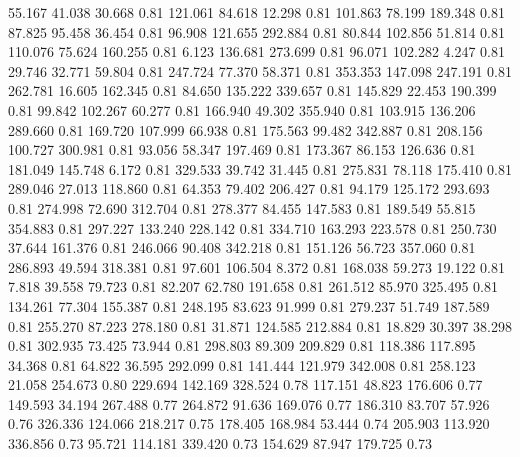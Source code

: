   55.167   41.038   30.668         0.81
 121.061   84.618   12.298         0.81
 101.863   78.199  189.348         0.81
  87.825   95.458   36.454         0.81
  96.908  121.655  292.884         0.81
  80.844  102.856   51.814         0.81
 110.076   75.624  160.255         0.81
   6.123  136.681  273.699         0.81
  96.071  102.282    4.247         0.81
  29.746   32.771   59.804         0.81
 247.724   77.370   58.371         0.81
 353.353  147.098  247.191         0.81
 262.781   16.605  162.345         0.81
  84.650  135.222  339.657         0.81
 145.829   22.453  190.399         0.81
  99.842  102.267   60.277         0.81
 166.940   49.302  355.940         0.81
 103.915  136.206  289.660         0.81
 169.720  107.999   66.938         0.81
 175.563   99.482  342.887         0.81
 208.156  100.727  300.981         0.81
  93.056   58.347  197.469         0.81
 173.367   86.153  126.636         0.81
 181.049  145.748    6.172         0.81
 329.533   39.742   31.445         0.81
 275.831   78.118  175.410         0.81
 289.046   27.013  118.860         0.81
  64.353   79.402  206.427         0.81
  94.179  125.172  293.693         0.81
 274.998   72.690  312.704         0.81
 278.377   84.455  147.583         0.81
 189.549   55.815  354.883         0.81
 297.227  133.240  228.142         0.81
 334.710  163.293  223.578         0.81
 250.730   37.644  161.376         0.81
 246.066   90.408  342.218         0.81
 151.126   56.723  357.060         0.81
 286.893   49.594  318.381         0.81
  97.601  106.504    8.372         0.81
 168.038   59.273   19.122         0.81
   7.818   39.558   79.723         0.81
  82.207   62.780  191.658         0.81
 261.512   85.970  325.495         0.81
 134.261   77.304  155.387         0.81
 248.195   83.623   91.999         0.81
 279.237   51.749  187.589         0.81
 255.270   87.223  278.180         0.81
  31.871  124.585  212.884         0.81
  18.829   30.397   38.298         0.81
 302.935   73.425   73.944         0.81
 298.803   89.309  209.829         0.81
 118.386  117.895   34.368         0.81
  64.822   36.595  292.099         0.81
 141.444  121.979  342.008         0.81
 258.123   21.058  254.673         0.80
 229.694  142.169  328.524         0.78
 117.151   48.823  176.606         0.77
 149.593   34.194  267.488         0.77
 264.872   91.636  169.076         0.77
 186.310   83.707   57.926         0.76
 326.336  124.066  218.217         0.75
 178.405  168.984   53.444         0.74
 205.903  113.920  336.856         0.73
  95.721  114.181  339.420         0.73
 154.629   87.947  179.725         0.73
